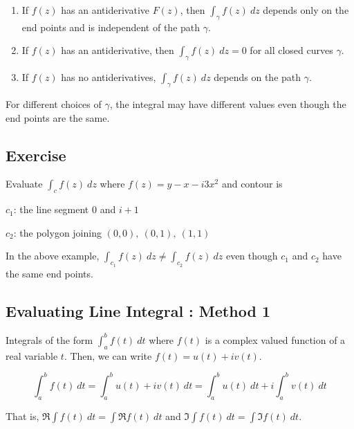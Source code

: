 
\begin{enumerate}
	\item If $f(z)$ has an antiderivative $F(z)$, then $\int_\gamma f(z)\ dz$ depends only on the end points and is independent of the path $\gamma$.
	\item If $f(z)$ has an antiderivative, then $\int_\gamma f(z)\ dz = 0$ for all closed curves $\gamma$.
	\item If $f(z)$ has no antiderivatives, $\int_\gamma f(z)\ dz$ depends on the path $\gamma$.
\end{enumerate}

	For different choices of $\gamma$, the integral may have different values even though the end points are the same.

\subsection{Exercise}
Evaluate $\int_c f(z)\ dz$ where $f(z) = y-x-i3x^2$ and contour is
\begin{itemize*}
	\item[$c_1$:]the line segment $0$ and $i+1$
	\item[$c_2$:] the polygon joining $(0,0),\ (0,1),\ (1,1)$ 
\end{itemize*}
In the above example, $\int_{c_1} f(z)\ dz \ne \int_{c_2}f(z)\ dz$ even though $c_1$ and $c_2$ have the same end points.

\subsection{Evaluating Line Integral : Method 1}
	Integrals of the form $\int_a^b f(t)\ dt$ where $f(t)$ is a complex valued function of a real variable $t$. Then, we can write $f(t) = u(t)+iv(t)$.

\[ \int_a^b f(t)\ dt = \int_a^b u(t) + iv(t)\ dt = \int_a^b u(t)\ dt + i\int_a^b v(t)\ dt \]

	That is, $\Re\int f(t)\ dt = \int \Re f(t)\ dt$ and $\Im\int f(t)\ dt = \int \Im f(t)\ dt$.


